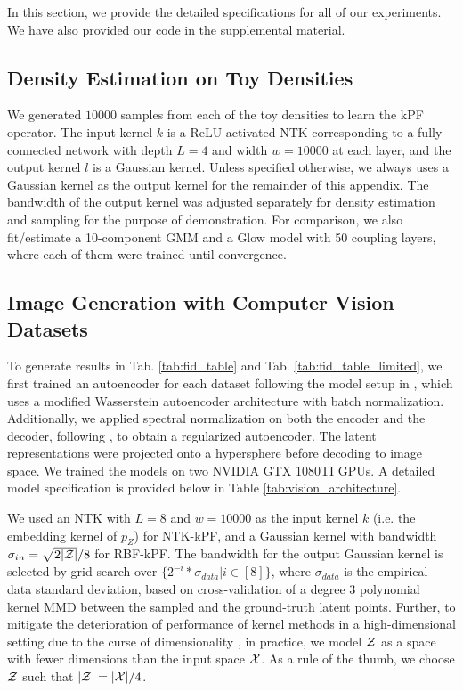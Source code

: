 In this section, we provide the detailed specifications for all of our experiments. We have also provided our code in the supplemental material.
\subsection{Density Estimation on Toy Densities}

We generated $10000$ samples from each of the toy densities to learn the kPF operator. The input kernel $k$ is a ReLU-activated NTK corresponding to a fully-connected network with depth $L = 4$ and width $w = 10000$ at each layer, and the output kernel $l$ is a Gaussian kernel. Unless specified otherwise, we always uses a Gaussian kernel as the output kernel for the remainder of this appendix. The bandwidth of the output kernel was adjusted separately for density estimation and sampling for the purpose of demonstration. For comparison, we also fit/estimate a 10-component GMM and a Glow model with 50 coupling layers, where each of them were trained until convergence.


\subsection{Image Generation with Computer Vision Datasets}

To generate results in Tab. \ref{tab:fid_table} and Tab. \ref{tab:fid_table_limited}, we first trained an autoencoder for each dataset following the model setup in \citep{Ghosh2020From}, which uses a modified Wasserstein autoencoder \citep{tolstikhin2018wasserstein} architecture with batch normalization. Additionally, we applied spectral normalization on both the encoder and the decoder, following \citep{Ghosh2020From}, to obtain a regularized autoencoder. The latent representations were projected onto a hypersphere before decoding to image space. We trained the models on two NVIDIA GTX 1080TI GPUs. A detailed model specification is provided below in Table \ref{tab:vision_architecture}.

We used an NTK with $L = 8$ and $w = 10000$ as the input kernel $k$ (i.e. the embedding kernel of $p_Z$) for NTK-kPF, and a Gaussian kernel with bandwidth $\sigma_{in} = {\sqrt{2 |\mathcal{Z}|}} / {8}$ for RBF-kPF. The bandwidth for the output Gaussian kernel is selected by grid search over $\{2^{-i} * \sigma_{data}| i \in [8]\}$, where $\sigma_{data}$ is the empirical data standard deviation, based on cross-validation of a degree 3 polynomial kernel MMD between the sampled and the ground-truth latent points. Further, to mitigate the deterioration of performance of kernel methods in a high-dimensional setting due to the curse of dimensionality \citep{Evangelista2006Taming}, in practice, we model $\mathcal{Z}$ as a space with fewer dimensions than the input space $\mathcal{X}$. As a rule of the thumb, we choose $\mathcal{Z}$ such that $|\mathcal{Z}| = |\mathcal{X}| / 4$.

